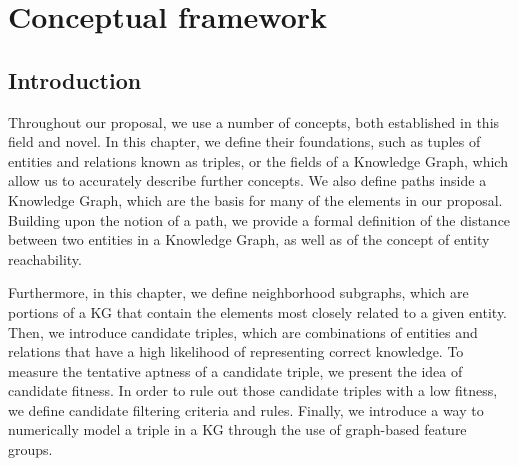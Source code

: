 \chapter{Conceptual framework}\label{chap:framework}



\section{Introduction}\label{sec:theo-intro}
Throughout our proposal, we use a number of concepts, both established in this field and novel. In this chapter, we define their foundations, such as tuples of entities and relations known as triples, or the fields of a Knowledge Graph, which allow us to accurately describe further concepts. We also define paths inside a Knowledge Graph, which are the basis for many of the elements in our proposal. Building upon the notion of a path, we provide a formal definition of the distance between two entities in a Knowledge Graph, as well as of the concept of entity reachability.

Furthermore, in this chapter, we define neighborhood subgraphs, which are portions of a KG that contain the elements most closely related to a given entity. Then, we introduce candidate triples, which are combinations of entities and relations that have a high likelihood of representing correct knowledge. To measure the tentative aptness of a candidate triple, we present the idea of candidate fitness. In order to rule out those candidate triples with a low fitness, we define candidate filtering criteria and rules. Finally, we introduce a way to numerically model a triple in a KG through the use of graph-based feature groups.

